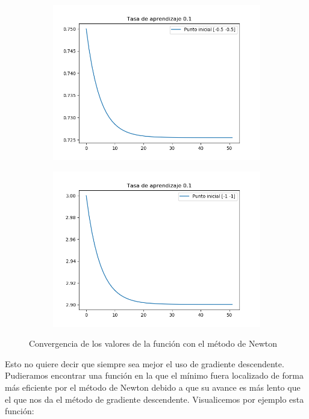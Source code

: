 \documentclass[12pt,a4paper]{article}
\begin{document}
\begin{figure}[H]
\begin{subfigure}{0.24\textwidth}
		\includegraphics[scale=0.3]{./Imagenes/bonus10.png}
	\end{subfigure}
	\begin{subfigure}{0.24\textwidth}
		\centering
		\includegraphics[scale=0.3]{./Imagenes/bonus11.png}
	\end{subfigure}
	\caption{Convergencia de los valores de la función con el método de Newton}
	\label{convergenciaNewton2}
\end{figure}

Esto no quiere decir que siempre sea mejor el uso de gradiente descendente. Pudieramos encontrar una función en la que el mínimo fuera localizado de forma más eficiente por el método de Newton debido a que su avance es más lento que el que nos da el método de gradiente descendente. Visualicemos por ejemplo esta función:
\end{document}
